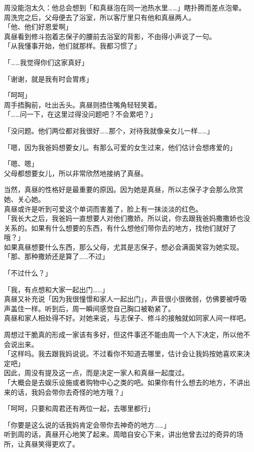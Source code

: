 周没能泡太久：他总会想到「和真昼泡在同一池热水里……」瞎扑腾而差点泡晕。\\

周洗完之后，父母便去了浴室，所以客厅里只有他和真昼两人。\\

「他、他们好恩爱啊」\\

真昼看到修斗抱着志保子的腰前去浴室的背影，不由得小声说了一句。\\

「从我懂事开始，他们就那样。我都习惯了」

「……我觉得你们这家真好」

「谢谢，就是我有时会胃疼」

「呵呵」\\

周手捂胸前，吐出舌头。真昼则捂住嘴角轻轻笑着。\\

「……问一下，在这里过得没问题吧？不会累吧？」

「没问题。他们两位都对我很好……那个，对待我就像亲女儿一样……」

「嗯，因为我爸妈想要女儿。有那么可爱的女生过来，他们估计会想疼爱的」

「嗯、嗯」\\

父母都想要女儿，所以非常欣然地接纳了真昼。

当然，真昼的性格好是最重要的原因。因为她是真昼，所以志保子才会那么欣赏她、关心她。\\

真昼或许是听到可爱这个单词而害羞了，脸上有一抹淡淡的红色。\\

「我长大之后，我爸妈一直想要人对他们撒娇。所以说，你去跟我爸妈撒撒娇也没关系的。如果有什么想要的东西，有什么想他们带你去的地方，找他们就好了哦？」\\

如果真昼想要什么东西，那么父母，尤其是志保子，想必会满面笑容为她实现。\\

「那、那种撒娇还是算了……不过」

「不过什么？」

「我，有点想和大家一起出门……」\\

真昼又补充说「因为我很憧憬和家人一起出门」，声音很小很微弱，仿佛要被呼吸声盖住一样。听到后，周一瞬间感觉自己胸口被勒紧了。\\

真昼和家人相处得不好。对她来说，与志保子、修斗的接触就如同家人间一样吧。

周想过干脆真的形成一家该有多好，但这件事还不能由周一个人下决定，所以他不会说出来。\\

「这样吗。我去跟我妈说说。不过看你不知道去哪里，估计会让我妈按她喜欢来决定吧」\\

因此，周没有提及这一点，而是决定一家人和真昼一起度过。\\

「大概会是去娱乐设施或者购物中心之类的吧。如果你有什么想去的地方，不讲出来的话，我妈会带你去奇怪的地方哦？」

「呵呵，只要和周君还有两位一起，去哪里都行」

「你要是这么说的话我妈肯定会带你去神奇的地方……」\\

听到周的话，真昼开心地笑了起来。周暗自安心下来，讲出他曾去过的奇异的场所，让真昼笑得更欢了。

